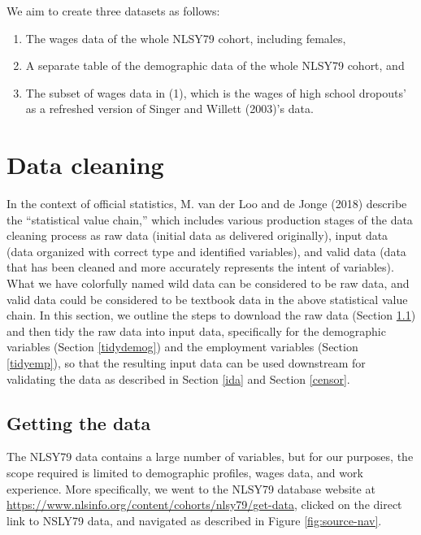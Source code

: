 \documentclass[12pt]{article}
\providecommand{\tightlist}{%
  \setlength{\itemsep}{0pt}\setlength{\parskip}{0pt}}
\begin{document}
We aim to create three datasets as follows:

\begin{enumerate}
\def\labelenumi{\arabic{enumi}.}
\tightlist
\item
  The wages data of the whole NLSY79 cohort, including females,
\item
  A separate table of the demographic data of the whole NLSY79 cohort, and
\item
  The subset of wages data in (1), which is the wages of high school dropouts' as a refreshed version of Singer and Willett (2003)'s data.
\end{enumerate}

\hypertarget{cleaning}{%
\section{Data cleaning}\label{cleaning}}

In the context of official statistics, M. van der Loo and de Jonge (2018) describe the ``statistical value chain,'' which includes various production stages of the data cleaning process as raw data (initial data as delivered originally), input data (data organized with correct type and identified variables), and valid data (data that has been cleaned and more accurately represents the intent of variables). What we have colorfully named wild data can be considered to be raw data, and valid data could be considered to be textbook data in the above statistical value chain. In this section, we outline the steps to download the raw data (Section \ref{getdata}) and then tidy the raw data into input data, specifically for the demographic variables (Section \ref{tidydemog}) and the employment variables (Section \ref{tidyemp}), so that the resulting input data can be used downstream for validating the data as described in Section \ref{ida} and Section \ref{censor}.

\hypertarget{getdata}{%
\subsection{Getting the data}\label{getdata}}

The NLSY79 data contains a large number of variables, but for our purposes, the scope required is limited to demographic profiles, wages data, and work experience. More specifically, we went to the NLSY79 database website at \url{https://www.nlsinfo.org/content/cohorts/nlsy79/get-data}, clicked on the direct link to NSLY79 data, and navigated as described in Figure \ref{fig:source-nav}.
\end{document}
